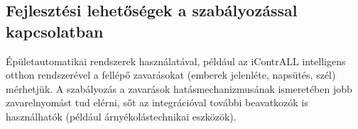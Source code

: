 \subsection{Fejlesztési lehetőségek a szabályozással kapcsolatban}
	
Épületautomatikai rendszerek használatával, például az iContrALL intelligens otthon rendszerével a fellépő zavarásokat (emberek jelenléte, napsütés, szél) mérhetjük. A szabályozás a zavarások hatásmechanizmusának ismeretében jobb zavarelnyomást tud elérni, sőt az integrációval további beavatkozók is használhatók (például árnyékolástechnikai eszközök).

